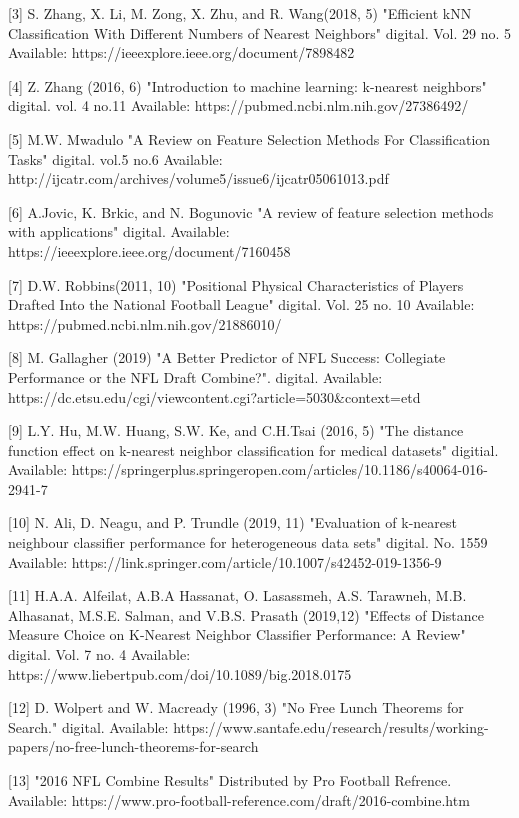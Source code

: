 \documentclass[confrence]{IEEEtran}
\begin{document}
[3] S. Zhang, X. Li, M. Zong, X. Zhu, and R. Wang(2018, 5) "Efficient kNN Classification With Different Numbers of Nearest Neighbors" digital. Vol. 29 no. 5 Available: https://ieeexplore.ieee.org/document/7898482

[4] Z. Zhang (2016, 6) "Introduction to machine learning: k-nearest neighbors" digital. vol. 4 no.11 Available: https://pubmed.ncbi.nlm.nih.gov/27386492/

[5] M.W. Mwadulo "A Review on Feature Selection Methods For Classification Tasks" digital. vol.5 no.6 Available: http://ijcatr.com/archives/volume5/issue6/ijcatr05061013.pdf

[6] A.Jovic, K. Brkic, and N. Bogunovic "A review of feature selection methods with applications" digital. Available: https://ieeexplore.ieee.org/document/7160458

[7] D.W. Robbins(2011, 10) "Positional Physical Characteristics of Players Drafted Into the National Football League" digital. Vol. 25 no. 10 Available: https://pubmed.ncbi.nlm.nih.gov/21886010/

[8] M. Gallagher (2019) "A Better Predictor of NFL Success: Collegiate Performance or the NFL Draft Combine?". digital. Available: https://dc.etsu.edu/cgi/viewcontent.cgi?article=5030&context=etd

[9] L.Y. Hu, M.W. Huang, S.W. Ke, and C.H.Tsai (2016, 5) "The distance function effect on k-nearest neighbor classification for medical datasets" digitial. Available: https://springerplus.springeropen.com/articles/10.1186/s40064-016-2941-7

[10] N. Ali, D. Neagu, and P. Trundle (2019, 11) "Evaluation of k-nearest neighbour classifier performance for heterogeneous data sets" digital. No. 1559  Available: https://link.springer.com/article/10.1007/s42452-019-1356-9

[11] H.A.A. Alfeilat, A.B.A Hassanat, O. Lasassmeh, A.S. Tarawneh, M.B. Alhasanat, M.S.E. Salman, and V.B.S. Prasath (2019,12) "Effects of Distance Measure Choice on K-Nearest Neighbor Classifier Performance: A Review" digital. Vol. 7 no. 4 Available: https://www.liebertpub.com/doi/10.1089/big.2018.0175

[12] D. Wolpert and W. Macready (1996, 3) "No Free Lunch Theorems for Search." digital. Available: https://www.santafe.edu/research/results/working-papers/no-free-lunch-theorems-for-search

[13] "2016 NFL Combine Results" Distributed by Pro Football Refrence. Available: https://www.pro-football-reference.com/draft/2016-combine.htm
\end{document}
